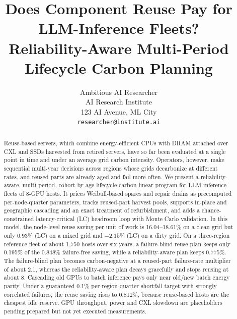 \documentclass{article} %
\title{Does Component Reuse Pay for LLM-Inference Fleets? \\ Reliability-Aware Multi-Period Lifecycle Carbon Planning}
\author{Ambitious AI Researcher\\
AI Research Institute\\
123 AI Avenue, ML City\\
\texttt{researcher@institute.ai}
}
\begin{document}
\maketitle

\begin{abstract}
Reuse-based servers, which combine energy-efficient CPUs with DRAM attached over CXL and SSDs harvested from retired servers, have so far been evaluated at a single point in time and under an average grid carbon intensity. Operators, however, make sequential multi-year decisions across regions whose grids decarbonize at different rates, and reused parts are already aged and fail more often. We present a reliability-aware, multi-period, cohort-by-age lifecycle-carbon linear program for LLM-inference fleets of 8-GPU hosts. It prices Weibull-based spares and repair drains as precomputed per-node-quarter parameters, tracks reused-part harvest pools, supports in-place and geographic cascading and an exact treatment of refurbishment, and adds a chance-constrained latency-critical (LC) headroom loop with Monte Carlo validation. In this model, the node-level reuse saving per unit of work is 16.04--18.61\% on a clean grid but only 0.93\% (LC) on a mixed grid and $-2.15\%$ (LC) on a dirty grid. On a three-region reference fleet of about 1,750 hosts over six years, a failure-blind reuse plan keeps only 0.195\% of the 0.848\% failure-free saving, while a reliability-aware plan keeps 0.775\%. The failure-blind plan becomes carbon-negative at a reused-part failure-rate multiplier of about 2.1, whereas the reliability-aware plan decays gracefully and stops reusing at about 8. Cascading old GPUs to batch inference pays only near old/new batch energy parity. Under a guaranteed 0.1\% per-region-quarter shortfall target with strongly correlated failures, the reuse saving rises to 0.812\%, because reuse-based hosts are the cheapest idle reserve. GPU throughput, power and CXL slowdown are placeholders pending prepared but not yet executed measurements.
\end{abstract}
\end{document}
